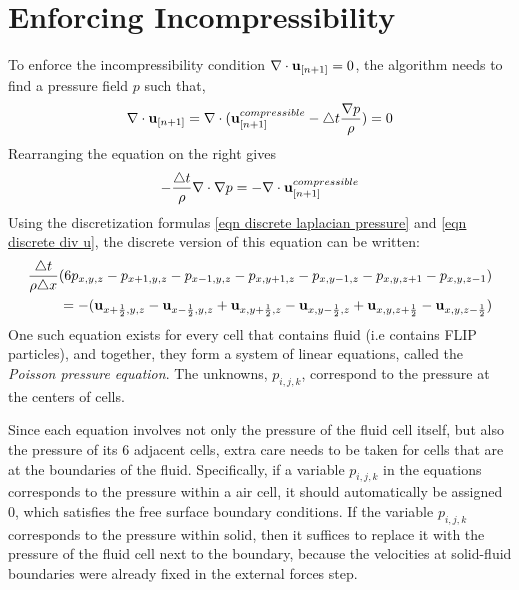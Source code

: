 \section{Enforcing Incompressibility}
\label{section enforce incompressibility}
To enforce the incompressibility condition $\nabla \cdot \textbf{u}_{[n+1]} = 0$, the algorithm needs to find a pressure field $p$ such that,
\begin{equation*}
    \begin{aligned}
        \nabla \cdot \textbf{u}_{[n+1]} = \nabla \cdot
        ( \textbf{u}_{[n+1]}^{compressible} - \triangle t \frac{\nabla p}{\rho} ) = 0
    \end{aligned}
\end{equation*}
Rearranging the equation on the right gives
$$
-\frac{\triangle t}{\rho} \nabla \cdot \nabla p = -\nabla \cdot \textbf{u}_{[n+1]}^{compressible}
$$
Using the discretization formulas \ref{eqn discrete laplacian pressure} and \ref{eqn discrete div u}, the discrete version of this equation can be written: 
\begin{equation*}
    \begin{aligned}
        \frac{\triangle t}{\rho \triangle x}(6p_{x,y,z}-p_{x+1,y,z}-p_{x-1,y,z}-p_{x,y+1,z}-p_{x,y-1,z}-p_{x,y,z+1}-p_{x,y,z-1}) \\
        = 
        -( \textbf{u}_{x+\frac{1}{2},y,z} - \textbf{u}_{x-\frac{1}{2},y,z}  +  
         \textbf{u}_{x,y+\frac{1}{2},z} - \textbf{u}_{x,y-\frac{1}{2},z} +
         \textbf{u}_{x,y,z+\frac{1}{2}} - \textbf{u}_{x,y,z-\frac{1}{2}})
    \end{aligned}
\end{equation*}
One such equation exists for every cell that contains fluid (i.e contains FLIP particles), and together, they form a system of linear equations, called the \textit{Poisson pressure equation}. The unknowns, $p_{i,j,k}$, correspond to the pressure at the centers of cells.

Since each equation involves not only the pressure of the fluid cell itself, but also the pressure of its 6 adjacent cells, extra care needs to be taken for cells that are at the boundaries of the fluid. Specifically, if a variable $p_{i,j,k}$ in the equations corresponds to the pressure within a air cell, it should automatically be assigned 0, which satisfies the free surface boundary conditions. If the variable $p_{i,j,k}$ corresponds to the pressure within solid, then it suffices to replace it with the pressure of the fluid cell next to the boundary, because the velocities at solid-fluid boundaries were already fixed in the external forces step.

